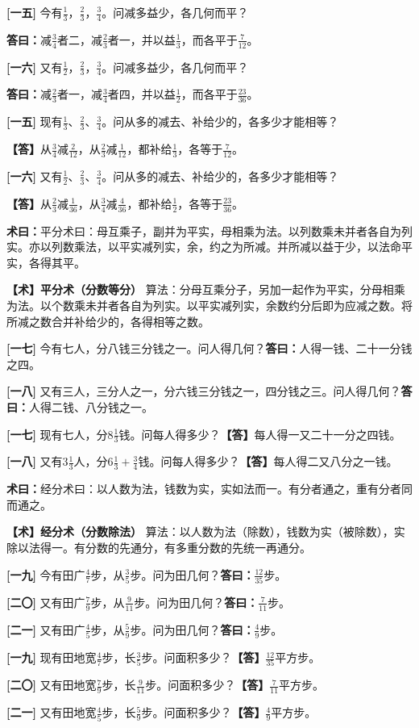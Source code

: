 \documentclass[10pt,a4paper]{article}
\newlength{\lw}
\newlength{\rw}
\newcommand{\bilingc}[2]{%
  \par\vspace{0.1em}%
  \noindent\begin{minipage}[t]{\lw}
  {\small #1}
  \end{minipage}%
  \hfill%
  \begin{minipage}[t]{\rw}
  {\small #2}
  \end{minipage}%
  \vspace{0.1em}%
}
\newcommand{\da}{\textbf{\textcolor{answercolor}{答曰：}}}
\newcommand{\daB}{\textbf{\textcolor{answercolor}{【答】}}}
\newcommand{\shu}{\textbf{\textcolor{methodcolor}{术曰：}}}
\newcommand{\shuB}{\textbf{\textcolor{methodcolor}{【术】}}}
\newcommand{\pn}[1]{\textbf{[#1]}}
\newcommand{\sk}{\vspace{0.1em}}
\begin{document}
\bilingc{
\pn{一五} 今有$\frac13$，$\frac23$，$\frac34$。问减多益少，各几何而平？

\da 减$\frac34$者二，减$\frac23$者一，并以益$\frac13$，而各平于$\frac{7}{12}$。

\pn{一六} 又有$\frac12$，$\frac23$，$\frac34$。问减多益少，各几何而平？

\da 减$\frac23$者一，减$\frac34$者四，并以益$\frac12$，而各平于$\frac{23}{36}$。
}{
\pn{一五} 现有$\frac{1}{3}$、$\frac{2}{3}$、$\frac{3}{4}$。问从多的减去、补给少的，各多少才能相等？

\daB 从$\frac{3}{4}$减$\frac{2}{12}$，从$\frac{2}{3}$减$\frac{1}{12}$，都补给$\frac{1}{3}$，各等于$\frac{7}{12}$。

\pn{一六} 又有$\frac{1}{2}$、$\frac{2}{3}$、$\frac{3}{4}$。问从多的减去、补给少的，各多少才能相等？

\daB 从$\frac{2}{3}$减$\frac{1}{36}$，从$\frac{3}{4}$减$\frac{4}{36}$，都补给$\frac{1}{2}$，各等于$\frac{23}{36}$。
}

\sk

\bilingc{
\shu 平分术曰：母互乘子，副并为平实，母相乘为法。以列数乘未并者各自为列实。亦以列数乘法，以平实减列实，余，约之为所减。并所减以益于少，以法命平实，各得其平。
}{
\shuB \textbf{平分术（分数等分）} 算法：分母互乘分子，另加一起作为平实，分母相乘为法。以个数乘未并者各自为列实。以平实减列实，余数约分后即为应减之数。将所减之数合并补给少的，各得相等之数。
}

\vspace{0.3em}

\bilingc{
\pn{一七} 今有七人，分八钱三分钱之一。问人得几何？\quad\da 人得一钱、二十一分钱之四。

\pn{一八} 又有三人，三分人之一，分六钱三分钱之一，四分钱之三。问人得几何？\quad\da 人得二钱、八分钱之一。
}{
\pn{一七} 现有七人，分$8\frac{1}{3}$钱。问每人得多少？\quad\daB 每人得一又二十一分之四钱。

\pn{一八} 又有$3\frac{1}{3}$人，分$6\frac{1}{3}+\frac{3}{4}$钱。问每人得多少？\quad\daB 每人得二又八分之一钱。
}

\sk

\bilingc{
\shu 经分术曰：以人数为法，钱数为实，实如法而一。有分者通之，重有分者同而通之。
}{
\shuB \textbf{经分术（分数除法）} 算法：以人数为法（除数），钱数为实（被除数），实除以法得一。有分数的先通分，有多重分数的先统一再通分。
}

\vspace{0.3em}

\bilingc{
\pn{一九} 今有田广$\frac47$步，从$\frac35$步。问为田几何？\quad\da $\frac{12}{35}$步。

\pn{二〇} 又有田广$\frac79$步，从$\frac9{11}$步。问为田几何？\quad\da $\frac{7}{11}$步。

\pn{二一} 又有田广$\frac45$步，从$\frac59$步。问为田几何？\quad\da $\frac49$步。
}{
\pn{一九} 现有田地宽$\frac{4}{7}$步，长$\frac{3}{5}$步。问面积多少？\quad\daB $\frac{12}{35}$平方步。

\pn{二〇} 又有田地宽$\frac{7}{9}$步，长$\frac{9}{11}$步。问面积多少？\quad\daB $\frac{7}{11}$平方步。

\pn{二一} 又有田地宽$\frac{4}{5}$步，长$\frac{5}{9}$步。问面积多少？\quad\daB $\frac{4}{9}$平方步。
}
\end{document}
